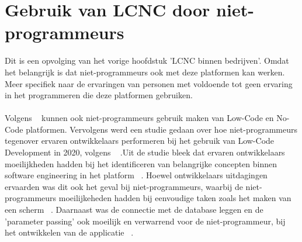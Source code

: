 \section{Gebruik van LCNC door niet-programmeurs}
\label{sec:lcnc-niet-programmeurs}
Dit is een opvolging van het vorige hoofdstuk 'LCNC binnen bedrijven'. Omdat het belangrijk is dat niet-programmeurs ook met deze platformen kan werken.
Meer specifiek naar de ervaringen van personen met voldoende  tot geen ervaring in het programmeren die deze platformen gebruiken.
\\
\\
Volgens ~\textcite{Yan2021} kunnen ook niet-programmeurs gebruik maken van Low-Code en No-Code platformen.
Vervolgens werd een studie gedaan over hoe niet-programmeurs tegenover ervaren ontwikkelaars performeren bij het gebruik van Low-Code Development  in 2020, volgens ~\textcite{Hintsch2021} 
.Uit de studie bleek dat ervaren ontwikkelaars moeilijkheden hadden bij het identificeren van belangrijke concepten binnen software engineering in het platform ~\autocite{Hintsch2021}.
Hoewel ontwikkelaars uitdagingen ervaarden was dit ook het geval bij niet-programmeurs, waarbij de niet-programmeurs moeilijkeheden hadden bij eenvoudige taken zoals het maken van een scherm  ~\autocite{Hintsch2021}.
Daarnaast was de connectie met de database leggen en de 'parameter passing' ook moeilijk en verwarrend voor de niet-programmeur, bij het ontwikkelen van de applicatie  ~\autocite{Hintsch2021}.





